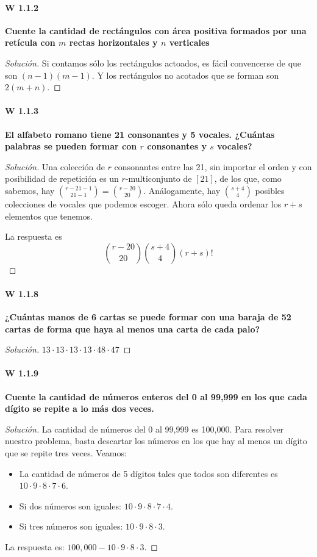\documentclass[spanish]{book}
\theoremstyle{definition}
\begin{document}
\paragraph{W 1.1.2}\textbf{Cuente la cantidad de rectángulos con área positiva formados por una retícula con $m$ rectas horizontales y $n$ verticales}
\begin{proof}[Solución]
	Si contamos sólo los rectángulos actoados, es fácil convencerse de que son $(n-1)(m-1)$. Y los rectángulos no acotados que se forman son $2(m+n)$.
\end{proof}

\paragraph{W 1.1.3}\textbf{El alfabeto romano tiene 21 consonantes y 5 vocales. ¿Cuántas palabras se pueden formar con $r$ consonantes y $s$ vocales?}
\begin{proof}[Solución]
	Una colección de $r$ consonantes entre las 21, sin importar el orden y con posibilidad de repetición es un $r$-multiconjunto de $[21]$, de los que, como sabemos, hay ${r-21-1\choose21-1}={r-20\choose20}$. Análogamente, hay ${s+4\choose4}$ posibles colecciones de vocales que podemos escoger. Ahora sólo queda ordenar los $r+s$ elementos que tenemos.
	
	La respuesta es
	\[{r-20\choose20}{s+4\choose4}(r+s)!\]
\end{proof}

\paragraph{W 1.1.8}\textbf{¿Cuántas manos de 6 cartas se puede formar con una baraja de 52 cartas de forma que haya al menos una carta de cada palo?}
\begin{proof}[Solución]
	$13\cdot13\cdot13\cdot13\cdot48\cdot47$
\end{proof}

\paragraph{W 1.1.9}\textbf{Cuente la cantidad de números enteros del 0 al 99,999 en los que cada dígito se repite a lo más dos veces.}
\begin{proof}[Solución]
	La cantidad de números del 0 al 99,999 es 100,000. Para resolver nuestro problema, basta descartar los números en los que hay al menos un dígito que se repite tres veces. Veamos:
	
	\begin{itemize}
		\item 	La cantidad de números de 5 dígitos tales que todos son diferentes es $10\cdot9\cdot8\cdot7\cdot6$.
		\item Si dos números son iguales: $10\cdot9\cdot8\cdot7\cdot4$.
		\item Si tres números son iguales: $10\cdot9\cdot8\cdot3$.
	\end{itemize}
	La respuesta es: $100,000-10\cdot9\cdot8\cdot3$.
\end{proof}
\end{document}
